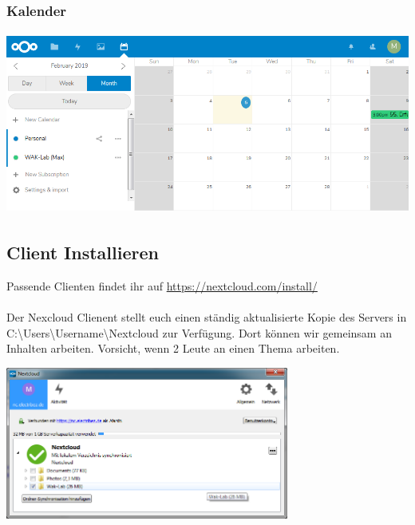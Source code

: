 \subsubsection{Kalender}
\begin{minipage}[t]{\textwidth}
  \centering
  \includegraphics[height=6cm]{pictures/NextcloudKalender.png}
  \label{img:NextcloudKalender}
\end{minipage}


\subsection{Client Installieren}
Passende Clienten findet ihr auf \url{https://nextcloud.com/install/}\\
\ \\
Der Nexcloud Clienent stellt euch einen ständig aktualisierte Kopie des Servers in C:\textbackslash Users\textbackslash Username\textbackslash Nextcloud zur Verfügung. Dort können wir gemeinsam an Inhalten arbeiten. Vorsicht, wenn 2 Leute an einen Thema arbeiten.\\
 
\begin{minipage}[t]{\textwidth}
  \centering
  \includegraphics[height=5cm]{pictures/NextcloudWinClient.png}
  \label{img:NextcloudWinClient}
\end{minipage}





